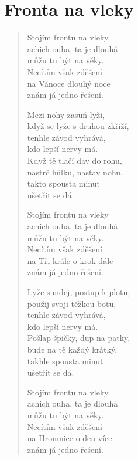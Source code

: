 \section {Fronta na vleky}

\thispagestyle{empty}

\begin{multicols}{2}


\begin{verse}
	

Stojím frontu na vleky\\
achich ouha, ta je dlouhá\\
můžu tu být na věky.\\
Necítím však zděšení\\
na Vánoce dlouhý noce\\
znám já jedno řešení.

Mezi nohy zasuň lyži,\\
když se lyže s druhou zkříží,\\
tenhle závod vyhrává,\\
kdo lepší nervy má.\\
Když tě tlačí dav do rohu,\\
nastrč hůlku, nastav nohu,\\
takto spousta minut\\
ušetřit se dá.

Stojím frontu na vleky\\
achich ouha, ta je dlouhá\\
můžu tu být na věky.\\
Necítím však zděšení\\
na Tři krále o krok dále\\
znám já jedno řešení.

Lyže sundej, postup k plotu,\\
použij svoji těžkou botu,\\
tenhle závod vyhrává,\\
kdo lepší nervy má.\\
Pošlap špičky, dup na patky,\\
bude na tě každý krátký,\\
takhle spousta minut\\
ušetřit se dá.

\columnbreak

Stojím frontu na vleky\\
achich ouha, ta je dlouhá\\
můžu tu být na věky.\\
Necítím však zděšení\\
na Hromnice o den více\\
znám já jedno řešení.


\end{verse}
\end{multicols}
